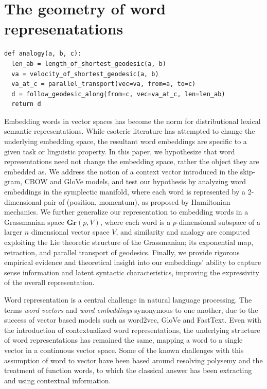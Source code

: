 \documentclass[11pt]{book}
\begin{document}
\chapter{The geometry of word represenatations}
\label{chapter:geometrization}

\begin{verbatim}
def analogy(a, b, c):
  len_ab = length_of_shortest_geodesic(a, b)
  va = velocity_of_shortest_geodesic(a, b)
  va_at_c = parallel_transport(vec=va, from=a, to=c)
  d = follow_geodesic_along(from=c, vec=va_at_c, len=len_ab)
  return d
\end{verbatim}

Embedding words in vector spaces has become the norm for distributional
lexical semantic representations. While esoteric literature has attempted
to change the underlying embedding space, the resultant word embeddings are
specific to a given task or linguistic property. In this paper, we
hypothesize that word representations need not change the embedding space,
rather the object they are embedded as. We address the notion of a context
vector introduced in the skip-gram, CBOW and GloVe models, and test our
hypothesis by analyzing word embeddings in the symplectic manifold, where
each word is represented by a 2-dimensional pair of (position, momentum),
as proposed by Hamiltonian mechanics. We further generalize our
representation to embedding words in a Grassmanian space $\mathbf{Gr}(p, V)$,
where each word is a $p$-dimensional subspace of a larger $n$
dimensional vector space $V$, and similarity and analogy are computed
exploiting the Lie theoretic structure of the Grassmanian; its exponential
map, retraction, and parallel transport of geodesics. Finally, we provide
rigorous empirical evidence and theoretical insight into our embeddings'
ability to capture sense information and latent syntactic characteristics,
improving the expressivity of the overall representation.

Word representation is a central challenge in natural language processing. The
terms \emph{word vectors} and \emph{word embeddings} synonymous to one another,
due to the success of vector based models such as word2vec, GloVe and FastText.
Even with the introduction of contextualized word representations, the
underlying structure of word representations has remained the same, mapping a
word to a single vector in a continuous vector space. Some of the known
challenges with this assumption of word to vector have been based around
resolving polysemy and the treatment of function words, to which the classical
answer has been extracting and using contextual information. 
\end{document}
